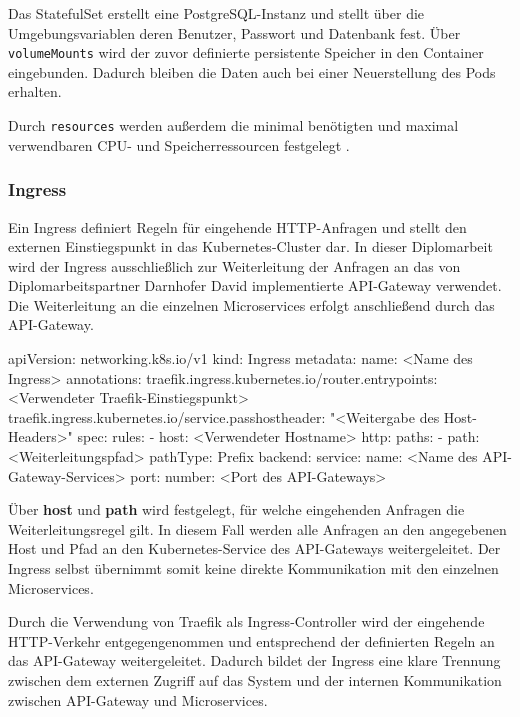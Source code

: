 Das StatefulSet erstellt eine PostgreSQL-Instanz und stellt über die Umgebungsvariablen deren Benutzer, Passwort und Datenbank fest. Über \texttt{volumeMounts} wird der zuvor definierte persistente Speicher in den Container eingebunden. Dadurch bleiben die Daten auch bei einer Neuerstellung des Pods erhalten.

Durch \texttt{resources} werden außerdem die minimal benötigten und maximal verwendbaren CPU- und Speicherressourcen festgelegt \cite{kubernetes_stateful_set}.

\newpage

\subsubsection{Ingress}

Ein Ingress definiert Regeln für eingehende HTTP-Anfragen und stellt den externen Einstiegspunkt in das Kubernetes-Cluster dar. In dieser Diplomarbeit wird der Ingress ausschließlich zur Weiterleitung der Anfragen an das von Diplomarbeitspartner Darnhofer David implementierte API-Gateway verwendet. Die Weiterleitung an die einzelnen Microservices erfolgt anschließend durch das API-Gateway.

\begin{CodeBox}
apiVersion: networking.k8s.io/v1
kind: Ingress
metadata:
  name: <Name des Ingress>
  annotations:
    traefik.ingress.kubernetes.io/router.entrypoints: <Verwendeter Traefik-Einstiegspunkt>
    traefik.ingress.kubernetes.io/service.passhostheader: "<Weitergabe des Host-Headers>"
spec:
  rules:
    - host: <Verwendeter Hostname>
      http:
        paths:
          - path: <Weiterleitungspfad>
            pathType: Prefix
            backend:
              service:
                name: <Name des API-Gateway-Services>
                port:
                  number: <Port des API-Gateways>
\end{CodeBox}

Über \textbf{host} und \textbf{path} wird festgelegt, für welche eingehenden Anfragen die Weiterleitungsregel gilt. In diesem Fall werden alle Anfragen an den angegebenen Host und Pfad an den Kubernetes-Service des API-Gateways weitergeleitet. Der Ingress selbst übernimmt somit keine direkte Kommunikation mit den einzelnen Microservices.

Durch die Verwendung von Traefik als Ingress-Controller wird der eingehende HTTP-Verkehr entgegengenommen und entsprechend der definierten Regeln an das API-Gateway weitergeleitet. Dadurch bildet der Ingress eine klare Trennung zwischen dem externen Zugriff auf das System und der internen Kommunikation zwischen API-Gateway und Microservices.

